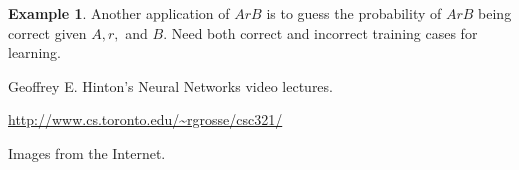 \documentclass[12pt]{article}
\theoremstyle{plain}
\theoremstyle{definition}
\newtheorem{example}[theorem]{Example}
\theoremstyle{remark}
\begin{document}
\begin{example}
Another application of $ArB$ is to guess the probability of $ArB$ being correct given $A, r,$ and $B.$ Need both correct and incorrect training cases for learning.
\end{example}

\begin{thebibliography}{99}

Geoffrey E. Hinton's Neural Networks video lectures.

\url{http://www.cs.toronto.edu/~rgrosse/csc321/}

Images from the Internet.

\end{thebibliography}
\end{document}
